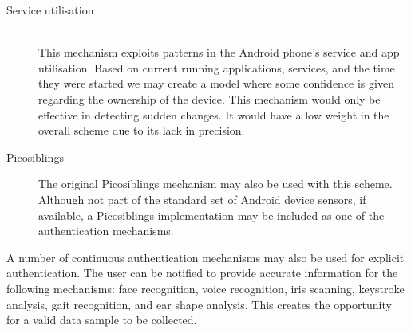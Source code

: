 \begin{description}
   \item[Service utilisation] \hfill \\
  This mechanism exploits patterns in the Android phone's service and app utilisation. Based on current running applications, services, and the time they were started we may create a model where some confidence is given regarding the ownership of the device. This mechanism would only be effective in detecting sudden changes. It would have a low weight in the overall scheme due to its lack in precision. 
  
  \item[Picosiblings]
  The original Picosiblings mechanism may also be used with this scheme. Although not part of the standard set of Android device sensors, if available, a Picosiblings implementation may be included as one of the authentication mechanisms.
\end{description}

A number of continuous authentication mechanisms may also be used for explicit authentication. The user can be notified to provide accurate information for the following mechanisms: face recognition, voice recognition, iris scanning, keystroke analysis, gait recognition, and ear shape analysis. This creates the opportunity for a valid data sample to be collected.

